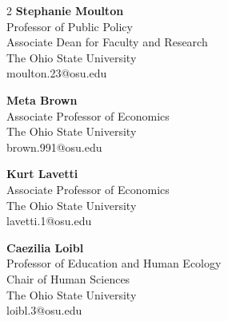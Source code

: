 \begin{multicols}{2}
\textbf{Stephanie Moulton} \\
Professor of Public Policy \\
Associate Dean for Faculty and Research \\
The Ohio State University \\
moulton.23@osu.edu

\medskip
\textbf{Meta Brown} \\
Associate Professor of Economics \\
The Ohio State University \\
brown.991@osu.edu

\columnbreak

\textbf{Kurt Lavetti} \\
Associate Professor of Economics \\
The Ohio State University \\
lavetti.1@osu.edu

\medskip
\textbf{Caezilia Loibl} \\
Professor of Education and Human Ecology \\
Chair of Human Sciences \\
The Ohio State University \\
loibl.3@osu.edu
\end{multicols}